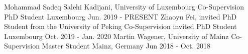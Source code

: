 
\begin{cventries}

  \cventry
    {Mohammad Sadeq Salehi Kadijani, University of Luxembourg} %
    {Co-Supervision PhD Student} %
    {Luxembourg} %
    {Jun. 2019 - PRESENT} %
    {
    }
\vspace{-.1cm}
  \cventry
    {Zhaoyu Fei, invited PhD Student from the University of Peking} %
    {Co-Supervision invited PhD Student} %
    {Luxembourg} %
    {Oct. 2019 - Jan. 2020} %
    {
    }
\vspace{-.1cm}
  \cventry
    {Martin Wagener, University of Mainz} %
    {Co-Supervision Master Student} %
    {Mainz, Germany} %
    {Jun 2018 - Oct. 2018} %
    {
    }

\end{cventries}
